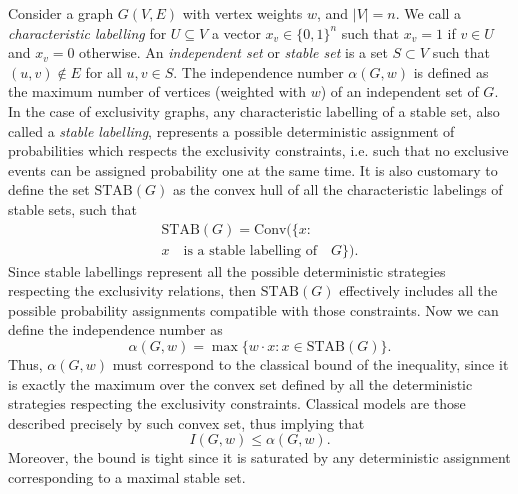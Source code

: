 \documentclass[letterpaper]{article}
\newcommand{\STAB}{\mathrm{STAB}}
\newcommand{\chull}{\mathrm{Conv}}
\begin{document}
Consider a graph $G(V, E)$ with vertex weights $w$, and $|V| = n$. We
call a \emph{characteristic labelling} for $U \subseteq V$ a vector $x_v
\in \{0,1\}^n$ such that $x_v = 1$ if $v \in U$ and $x_v = 0$ otherwise.
An \emph{independent set} or \emph{stable set} is a set $S \subset V$
such that $(u,v) \notin E$ for all $u,v \in S$.  The independence number
$\alpha(G, w)$ is defined as the maximum number of vertices (weighted
with $w$) of an independent set of $G$.  In the case of exclusivity
graphs, any characteristic labelling of a stable set, also called a
\emph{stable labelling}, represents a possible deterministic assignment of
probabilities which respects the exclusivity constraints, i.e. such that
no exclusive events can be assigned probability one at the same time.
It is also customary to define the set $\STAB(G)$ as the convex hull of
all the characteristic labelings of stable sets, such that
\begin{multline} 
    \STAB(G) = \chull (\{x : \\ x \quad \text{is a stable labelling of}\quad G \}).
    \label{eq:stab}
\end{multline}
Since stable labellings represent all the possible deterministic strategies respecting the exclusivity relations, then $\STAB(G)$ effectively includes  all the possible 
probability assignments compatible with those constraints.
Now we can define the independence number as
\begin{equation}
    \alpha(G,w) = \max\{w\cdot x: x \in \STAB(G)\}.
    \label{eq:alphastab}
\end{equation}
Thus, $\alpha(G,w)$ must correspond to the classical bound of the
inequality, since it is exactly the maximum over the convex set defined by
all the deterministic strategies respecting the exclusivity constraints.
Classical models are those described precisely by such convex set,
thus implying that
\begin{equation}
    I(G,w) \le \alpha(G,w).
    \label{eq:linconstG_alphabound}
\end{equation}
Moreover, the bound is tight since it is saturated by any deterministic
assignment corresponding to a maximal stable set.
\end{document}
